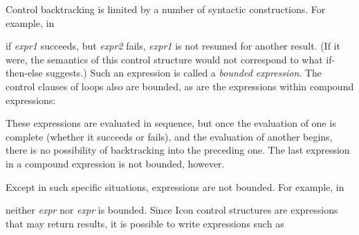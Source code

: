 Control backtracking is limited by a number of syntactic
constructions. For example, in



\noindent if \textit{expr1} succeeds, but \textit{expr2} fails,
\textit{expr1} is not resumed for another result. (If it were, the
semantics of this control structure would not correspond to what
{\textquotedbl}if-then-else{\textquotedbl} suggests.)  Such an
expression is called a \textit{bounded expression}. The control
clauses of loops also are bounded, as are the expressions within
compound expressions:



These expressions are evaluated in sequence, but once the evaluation
of one is complete (whether it succeeds or fails), and the evaluation
of another begins, there is no possibility of backtracking into the
preceding one. The last expression in a compound expression is not
bounded, however.

Except in such specific situations, expressions are not bounded. For
example, in



\noindent neither \textit{expr}\textit{} nor
\textit{expr}\textit{} is bounded. Since Icon control
structures are expressions that may return results, it is possible to
write expressions such as



